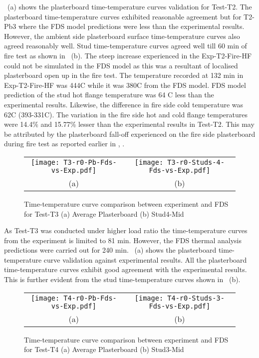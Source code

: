 ~(a) shows the plasterboard time-temperature curves validation for Test-T2. The plasterboard time-temperature curves exhibited reasonable agreement but for T2-Pb3 where the FDS model predictions were less than the experimental results. However, the ambient side plasterboard surface time-temperature curves also agreed reasonably well. Stud time-temperature curves agreed well till 60 min of fire test as shown in ~(b). The steep increase experienced in the Exp-T2-Fire-HF could not be simulated in the FDS model as this was a resultant of localised plasterboard open up in the fire test. The temperature recorded at 132 min in Exp-T2-Fire-HF was 444\degree C while it was 380\degree C from the FDS model. FDS model prediction of the stud hot flange temperature was 64 \degree C less than the experimental results. Likewise, the difference in fire side cold temperature was 62\degree C (393-331\degree C). The variation in the fire side hot and cold flange temperatures were 14.4\% and 15.77\% lesser than the experimental results in Test-T2. This may be attributed by the plasterboard fall-off experienced on the fire side plasterboard during fire test as reported earlier in , .
\begin{figure}[!htbp]
	\centering
		\begin{tabular}{cc}
			\texttt{[image: T3-r0-Pb-Fds-vs-Exp.pdf]} & \texttt{[image: T3-r0-Studs-4-Fds-vs-Exp.pdf]} \\
			(a) & (b) \\
		\end{tabular} 
		\caption{Time-temperature curve comparison between experiment and FDS for Test-T3 (a) Average Plasterboard (b) Stud4-Mid}
		\label{fig:fds-output-pb-studs-t3}
\end{figure}

As Test-T3 was conducted under higher load ratio the time-temperature curves from the experiment is limited to 81 min. However, the FDS thermal analysis predictions were carried out for 240 min. ~(a) shows the plasterboard time-temperature curve validation against experimental results. All the plasterboard time-temperature curves exhibit good agreement with the experimental results. This is further evident from the stud time-temperature curves shown in ~(b).
\begin{figure}[!htbp]
	\centering
		\begin{tabular}{cc}
			\texttt{[image: T4-r0-Pb-Fds-vs-Exp.pdf]} & \texttt{[image: T4-r0-Studs-3-Fds-vs-Exp.pdf]} \\
			(a) & (b) \\
		\end{tabular} 
		\caption{Time-temperature curve comparison between experiment and FDS for Test-T4 (a) Average Plasterboard (b) Stud3-Mid}
		\label{fig:fds-output-pb-studs-t4}
\end{figure}

